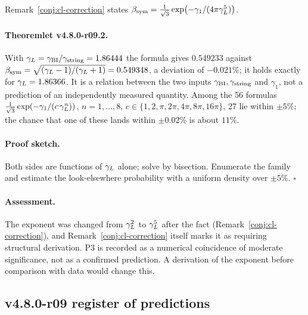 Remark~\ref{conj:cl-correction} states \(\beta_{\mathrm{sym}}=\tfrac1{\sqrt3}\exp\bigl(-\gamma_1/(4\pi\gamma_L^5)\bigr)\).

\paragraph{Theoremlet v4.8.0-r09.2.}
With \(\gamma_L=\gamma_{\mathrm{BI}}/\gamma_{\mathrm{string}}=1.86444\) the formula gives \(0.549233\) against
\(\beta_{\mathrm{sym}}=\sqrt{(\gamma_L-1)/(\gamma_L+1)}=0.549348\), a deviation of \(-0.021\%\); it holds exactly for
\(\gamma_L=1.86366\).  It is a relation between the two inputs \(\gamma_{\mathrm{BI}},\gamma_{\mathrm{string}}\) and \(\gamma_1\), not a
prediction of an independently measured quantity.  Among the 56 formulas
\(\tfrac1{\sqrt3}\exp(-\gamma_1/(c\,\gamma_L^n))\), \(n=1,\dots,8\),
\(c\in\{1,2,\pi,2\pi,4\pi,8\pi,16\pi\}\), 27 lie within \(\pm5\%\); the chance that one of these lands
within \(\pm0.02\%\) is about \(11\%\).

\paragraph{Proof sketch.}
Both sides are functions of \(\gamma_L\) alone; solve by bisection.  Enumerate the family and estimate the
look-elsewhere probability with a uniform density over \(\pm5\%\).  \(\square\)

\paragraph{Assessment.}
The exponent was changed from \(\gamma_L^2\) to \(\gamma_L^5\) after the fact (Remark~\ref{conj:cl-correction}),
and Remark~\ref{conj:cl-correction} itself marks it as requiring structural derivation.  P3 is
recorded as a numerical coincidence of moderate significance, not as a confirmed prediction.  A
derivation of the exponent before comparison with data would change this.

\subsection*{v4.8.0-r09 register of predictions}
\label{subsec:v480-r09-predictions}

